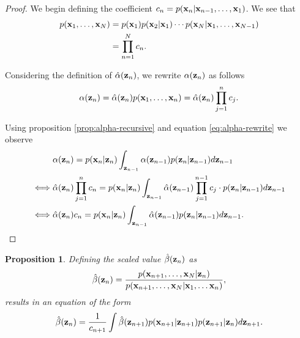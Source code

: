 \documentclass[11pt]{article}
\numberwithin{equation}{section}
\newcommand{\x}{{\bf x}}
\newcommand{\z}{{\bf z}}
\newtheorem{proposition}{Proposition}[section]
\begin{document}
\begin{proof}
	We begin defining the coefficient $c_n = p(\x_n \vert \x_{n-1}, \ldots, \x_1)$. We see that
	\begin{align}
		p(\x_1, \ldots, \x_N) &=  p(\x_1) p(\x_2 \vert \x_1) \cdots p(\x_N \vert \x_1, \ldots, \x_{N-1})\\
		&= \prod_{n=1}^N c_n.
	\end{align}
	
	Considering the definition of $\hat\alpha(\z_n)$, we rewrite $\alpha(\z_n)$ as follows
	\begin{equation} \label{eq:alpha-rewrite}
		\alpha(\z_n) = \hat\alpha(\z_n) p(\x_1, \ldots, \x_n) = \hat\alpha(\z_n) \prod_{j=1}^n c_j.
	\end{equation}
	
	Using proposition \ref{prop:alpha-recursive} and equation \eqref{eq:alpha-rewrite} we observe
	\begin{align}
		&\alpha(\z_n) = p(\x_n\vert \z_n) \int_{\z_{n-1}} \alpha(\z_{n-1})p(\z_n\vert\z_{n-1}) d\z_{n-1}\\
		\iff & \hat\alpha(\z_n) \prod_{j=1}^{n} c_n = p(\x_n \vert \z_n) \int_{\z_{n-1}} \hat\alpha(\z_{n-1}) \prod_{j=1}^{n-1} c_j \cdot  p(\z_n\vert\z_{n-1}) d\z_{n-1}\\
		\iff & \hat\alpha(\z_n) c_n =   p(\x_n \vert \z_n) \int_{\z_{n-1}} \hat\alpha(\z_{n-1})   p(\z_n\vert\z_{n-1}) d\z_{n-1}.
	\end{align}
	
	
\end{proof}

\begin{proposition} \label{prop:beta-hat}
	Defining the scaled value $\hat\beta(\z_n)$ as
	\begin{equation}
		\hat\beta(\z_n) = \frac{p(\x_{n+1}, \ldots, \x_N \vert \z_n)}{p(\x_{n+1}, \ldots, \x_N \vert \x_1, \ldots \x_n)},
	\end{equation}
	results in an equation of the form
	\begin{equation}
		\hat\beta(\z_n) = \frac{1}{c_{n+1}}\int \hat\beta(\z_{n+1})p(\x_{n+1}\vert\z_{n+1})p(\z_{n+1}\vert\z_n) d\z_{n+1}.
	\end{equation}
\end{proposition}
\end{document}
